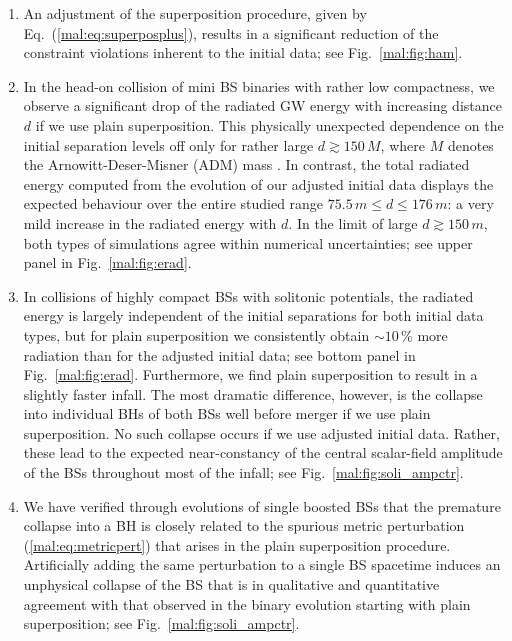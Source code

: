 \begin{enumerate}
  \item An adjustment of the superposition procedure, given
  by Eq.~(\ref{mal:eq:superposplus}), results in a significant
  reduction of the constraint violations inherent to the initial data;
  see Fig.~\ref{mal:fig:ham}.
  \item In the head-on collision of mini BS binaries with rather low compactness,
  we observe a significant drop of the radiated GW energy with increasing
  distance $d$ if we use plain superposition. This physically unexpected dependence
  on the initial separation levels off only for rather large
  $d\gtrsim 150\,M$,
  where $M$ denotes the Arnowitt-Deser-Misner (ADM) mass
  \cite{Arnowitt:1962hi}. In contrast, the total radiated energy computed from
  the evolution of our adjusted initial data displays the expected
  behaviour over the entire studied range $75.5\,m\le d\le 176\,m$:
  a very mild increase in the radiated energy with $d$. In the limit of large
  $d \gtrsim 150\,m$, both types of simulations agree within numerical uncertainties;
  see upper panel in Fig.~\ref{mal:fig:erad}.
  \item In collisions of highly compact BSs with solitonic potentials,
  the radiated energy is largely independent of the initial separations
  for both initial data types, but for plain superposition we consistently
  obtain $\sim 10\,\%$ more radiation than for the adjusted initial data;
  see bottom panel in Fig.~\ref{mal:fig:erad}. Furthermore,
  we find plain superposition to result in a slightly faster infall.
  The most dramatic difference, however, is the collapse into individual BHs
  of both BSs well before merger if we use plain superposition. No such collapse
  occurs if we use adjusted initial data. Rather,
  these lead to the expected near-constancy of the central scalar-field amplitude
  of the BSs throughout most of the infall; see Fig.~\ref{mal:fig:soli_ampctr}.
  \item We have verified through evolutions of single boosted BSs that the
  premature collapse into a BH is closely related to the spurious metric
  perturbation (\ref{mal:eq:metricpert}) that arises in the plain superposition
  procedure. Artificially adding the same perturbation to a single BS
  spacetime induces an unphysical collapse of the BS that is in
  qualitative and quantitative agreement with that observed in
  the binary evolution starting with plain superposition;
  see Fig.~\ref{mal:fig:soli_ampctr}.
\end{enumerate}



